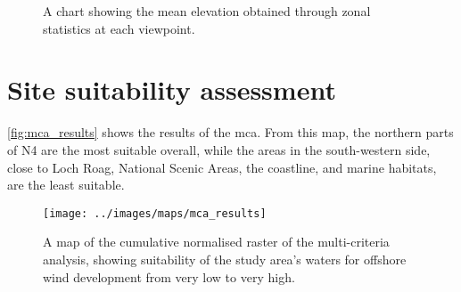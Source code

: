 \begin{figure}
  \centering
  \caption{A chart showing the mean elevation obtained through zonal statistics at each viewpoint. \label{fig:zs_elevation}}
\end{figure}

\section{Site suitability assessment}

\autoref{fig:mca_results} shows the results of the \gls{mca}. From this map, the northern parts of N4 are the most suitable overall, while the areas in the south-western side, close to Loch Roag, National Scenic Areas, the coastline, and marine habitats, are the least suitable.

\begin{figure}
  \centering
  \texttt{[image: ../images/maps/mca\_results]}
  \caption{A map of the cumulative normalised raster of the multi-criteria
  analysis, showing suitability of the study area's waters for
  offshore wind development from very low to very high. \label{fig:mca_results}}
\end{figure}
